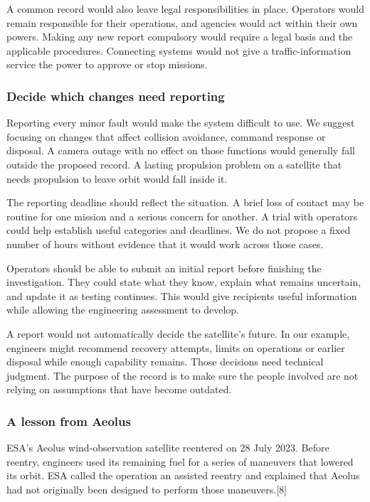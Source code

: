 \documentclass[11pt,letterpaper]{article}
\begin{document}
A common record would also leave legal responsibilities in place.
Operators would remain responsible for their operations, and agencies
would act within their own powers. Making any new report compulsory
would require a legal basis and the applicable procedures. Connecting
systems would not give a traffic-information service the power to
approve or stop missions.

\hypertarget{decide-which-changes-need-reporting}{%
\subsubsection{Decide which changes need
reporting}\label{decide-which-changes-need-reporting}}

Reporting every minor fault would make the system difficult to use. We
suggest focusing on changes that affect collision avoidance, command
response or disposal. A camera outage with no effect on those functions
would generally fall outside the proposed record. A lasting propulsion
problem on a satellite that needs propulsion to leave orbit would fall
inside it.

The reporting deadline should reflect the situation. A brief loss of
contact may be routine for one mission and a serious concern for
another. A trial with operators could help establish useful categories
and deadlines. We do not propose a fixed number of hours without
evidence that it would work across those cases.

Operators should be able to submit an initial report before finishing
the investigation. They could state what they know, explain what remains
uncertain, and update it as testing continues. This would give
recipients useful information while allowing the engineering assessment
to develop.

A report would not automatically decide the satellite's future. In our
example, engineers might recommend recovery attempts, limits on
operations or earlier disposal while enough capability remains. Those
decisions need technical judgment. The purpose of the record is to make
sure the people involved are not relying on assumptions that have become
outdated.

\hypertarget{a-lesson-from-aeolus}{%
\subsubsection{A lesson from Aeolus}\label{a-lesson-from-aeolus}}

ESA's Aeolus wind-observation satellite reentered on 28 July 2023.
Before reentry, engineers used its remaining fuel for a series of
maneuvers that lowered its orbit. ESA called the operation an assisted
reentry and explained that Aeolus had not originally been designed to
perform those maneuvers.{[}8{]}
\end{document}
